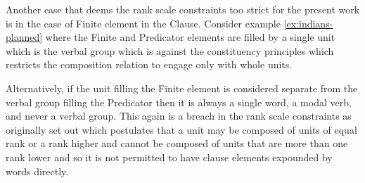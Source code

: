     \begin{table}[!ht]
        \centering
        \caption{Sydney grammar Mood analysis of Example \ref{ex:indians-planned}}
        \label{tab:indians-planned-sydney}
    \end{table}

    Another case that deems the rank scale constraints too strict for the present work is in the case of Finite element in the Clause. Consider example \ref{ex:indians-planned} where the Finite and Predicator elements are filled by a single unit which is the verbal group which is against the constituency principles which restricts the composition relation to engage only with whole units. 
    
    Alternatively, if the unit filling the Finite element is considered separate from the verbal group filling the Predicator then it is always a single word, a modal verb, and never a verbal group. This again is a breach in the rank scale constraints as originally set out which postulates that a unit may be composed of units of equal rank or a rank higher and cannot be composed of units that are more than one rank lower and so it is not permitted to have clause elements expounded by words directly. 
    
